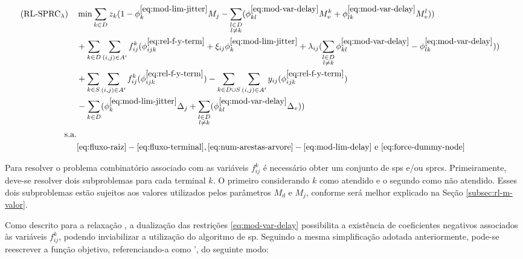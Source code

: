 \begin{align}
(\text{RL-SPRC}_{\lambda}) \quad
    & \nonumber \displaystyle \min \sum_{k \in D}z_k (1 - \phi^{\ref{eq:mod-lim-jitter}}_{k}M_j - \sum_{\substack{l \in D \\ l \neq k}}(\phi^{\ref{eq:mod-var-delay}}_{kl}M_v^k + \phi^{\ref{eq:mod-var-delay}}_{lk}M_v^l)) & \\ 
    & \nonumber \displaystyle + \sum_{k \in D} \sum_{(i, j) \in A'} f_{ij}^{k} (\phi^{\ref{eq:rel-f-y-term}}_{ijk} + \xi_{ij} \phi^{\ref{eq:mod-lim-jitter}}_{k} + \lambda_{ij} (\sum_{\substack{l \in D \\ l \neq k}} \phi^{\ref{eq:mod-var-delay}}_{kl} - \phi^{\ref{eq:mod-var-delay}}_{lk})) & \\
   & \nonumber \displaystyle + \sum_{k \in S} \sum_{(i, j) \in A'} f_{ij}^{k}(\phi^{\ref{eq:rel-f-y-term}}_{ijk}) - \sum_{k \in D \cup S} \sum_{(i, j) \in A'} y_{ij}(\phi^{\ref{eq:rel-f-y-term}}_{ijk})  & \\
   & \displaystyle - \sum_{k \in D} (\phi^{\ref{eq:mod-lim-jitter}}_{k} \Delta_j + \sum_{\substack{l \in D \\ l \neq k}} (\phi^{\ref{eq:mod-var-delay}}_{kl} \Delta_v)) & \label{eq:fo-sprc-delay} \\
\nonumber \text{s.a.} \\ \quad
    & \nonumber \eqref{eq:fluxo-raiz}-\eqref{eq:fluxo-terminal}, \eqref{eq:num-arestas-arvore}-\eqref{eq:mod-lim-delay} \text{ e } \eqref{eq:force-dummy-node} & 
\end{align}

Para resolver o problema combinatório  associado com as variáveis $f_{ij}^{k}$ é
necessário  obter  um conjunto  de  \gls{sp}s  e/ou \gls{sprc}s.  Primeiramente,
deve-se  resolver  dois   subproblemas  para  cada  terminal   $k$.  O  primeiro
considerando  $k$ como  atendido  e  o segundo  como  não  atendido. Esses  dois
subproblemas  estão sujeitos  aos valores  utilizados pelos  parâmetros $M_d$  e
$M_j$, conforme será melhor explicado na Seção \ref{subsec:rl-m-valor}.


Como   descrito  para   a  relaxação   {\rlu},  a   dualização  das   restrições
\eqref{eq:mod-var-delay}  possibilita  a  existência de  coeficientes  negativos
associados  às  variáveis  $f_{ij}^k$,  podendo  inviabilizar  a  utilização  do
algoritmo  de \gls{sp}.  Seguindo a  mesma simplificação  adotada anteriormente,
pode-se reescrever a função objetivo,  referenciando-a como {\rld}', do seguinte
modo:

